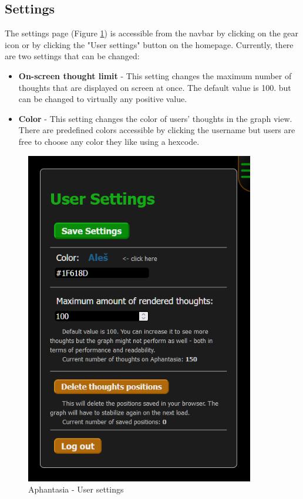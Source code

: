 \subsection{Settings}
The settings page (Figure \ref{obr:afantazie_user_settings}) is accessible from the navbar by clicking on the gear icon or by clicking the "User settings" button on the homepage.
Currently, there are two settings that can be changed:
\begin{itemize}
  \item \textbf{On-screen thought limit} - This setting changes the maximum number of thoughts that are displayed on screen at once.
 The default value is 100. but can be changed to virtually any positive value.
  \item \textbf{Color} - This setting changes the color of users' thoughts in the graph view.
 There are predefined colors accessible by clicking the username but users are free to choose any color they like using a hexcode.
\end{itemize}

\begin{figure}[h]\centering
  \includegraphics[width=100mm, keepaspectratio]{img/afantazie_user_settings.png}
  \caption{Aphantasia - User settings}
  \label{obr:afantazie_user_settings}
\end{figure}

